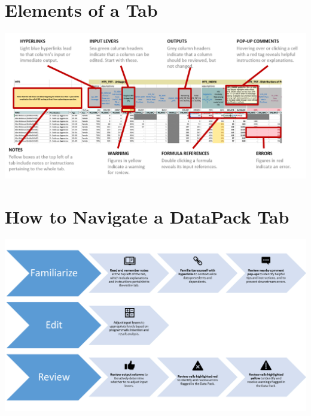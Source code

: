 \documentclass[
  openany]{book}
\begin{document}
\newpage

\hypertarget{elements-of-a-tab}{%
\section{Elements of a Tab}\label{elements-of-a-tab}}

\begin{center}

\includegraphics[width=9in]{./images/image4.png}

\end{center}

\newpage

\hypertarget{how-to-navigate-a-datapack-tab}{%
\section{How to Navigate a DataPack Tab}\label{how-to-navigate-a-datapack-tab}}

\begin{center}

\includegraphics[width=9in]{./images/image5.png}

\end{center}
\end{document}
